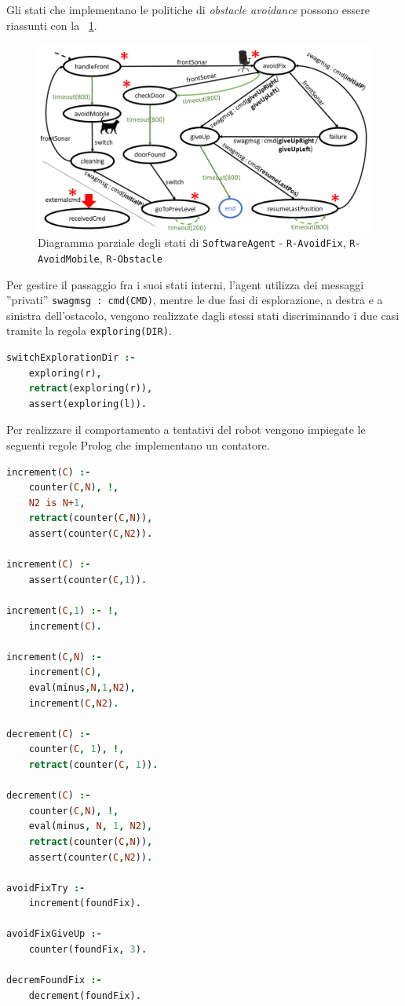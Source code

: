 \documentclass{../llncs}
\newcommand{\codescript}[1]{{\mbox{\small{\texttt{#1}}}}\xspace}
\newcommand{\code}[1]{{\color{blue}\small{\texttt{#1}}}}
\newcommand{\labelfig}[1]{\label{fig:#1}}
\newcommand{\xf}[1]{\figurename~\ref{fig:#1}}
\begin{document}
Gli stati che implementano le politiche di \emph{obstacle avoidance} possono essere riassunti con la \xf{obstacleAvoidance}.

\begin{figure}[!htb]
\centering
\includegraphics[scale=0.4]{img/stateDiagramObstacle.png}
\caption{Diagramma parziale degli stati di \texttt{SoftwareAgent} - \code{R-AvoidFix}, \code{R-AvoidMobile}, \code{R-Obstacle}}\labelfig{obstacleAvoidance}
\end{figure}

Per gestire il passaggio fra i suoi stati interni, l'agent utilizza dei messaggi ''privati'' \codescript{swagmsg : cmd(CMD)}, mentre le due fasi di esplorazione, a destra e a sinistra dell'ostacolo, vengono realizzate dagli stessi stati discriminando i due casi tramite la regola \codescript{exploring(DIR)}.\\

\begin{lstlisting}[language=Prolog, keywordstyle=\color{black}, caption={SoftwareAgent, Rules - pt2}]
switchExplorationDir :-
	exploring(r),
	retract(exploring(r)),
	assert(exploring(l)).
\end{lstlisting}

Per realizzare il comportamento a tentativi del robot vengono impiegate le seguenti regole Prolog che implementano un contatore.\\

\begin{lstlisting}[language=Prolog, keywordstyle=\color{black}, caption={SoftwareAgent, Rules - pt3}]
increment(C) :-
	counter(C,N), !,
	N2 is N+1,
	retract(counter(C,N)),
	assert(counter(C,N2)).
	
increment(C) :-
	assert(counter(C,1)).
	
increment(C,1) :- !,
	increment(C).
	
increment(C,N) :-
	increment(C),
	eval(minus,N,1,N2),
	increment(C,N2).

decrement(C) :-
	counter(C, 1), !,
	retract(counter(C, 1)).

decrement(C) :-
	counter(C,N), !,
	eval(minus, N, 1, N2),
	retract(counter(C,N)),
	assert(counter(C,N2)).

avoidFixTry :-
	increment(foundFix).

avoidFixGiveUp :-
	counter(foundFix, 3).

decremFoundFix :-
	decrement(foundFix).
\end{lstlisting}
\end{document}
